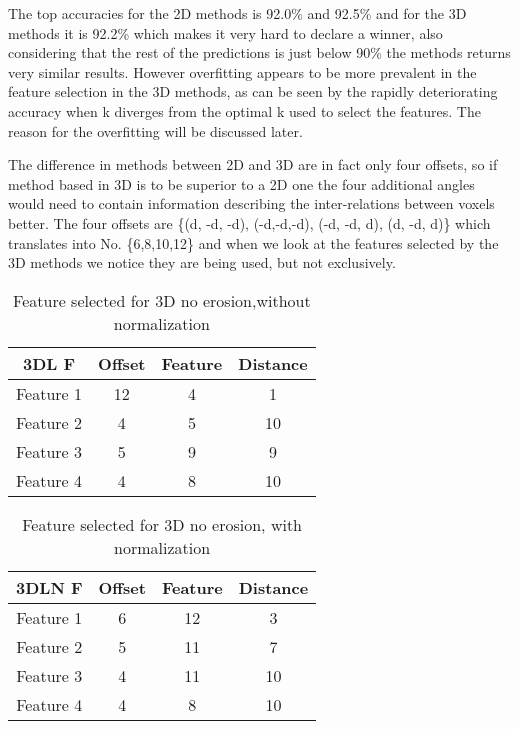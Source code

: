The top accuracies for the 2D methods is 92.0\% and 92.5\% and for the 3D methods it is 92.2\% which makes it very hard to declare a winner, also considering that the rest of the predictions is just below 90\% the methods returns very similar results. However overfitting appears to be more prevalent in the feature selection in the 3D methods, as can be seen by the rapidly deteriorating accuracy when k diverges from the optimal k used to select the features. The reason for the overfitting will be discussed later.

The difference in methods between 2D and 3D are in fact only four offsets, so if method based in 3D is to be superior to a 2D one the four additional angles would need to contain information describing the inter-relations between voxels better. The four offsets are \{(d, -d, -d), (-d,-d,-d), (-d, -d, d), (d, -d, d)\} which translates into No. \{6,8,10,12\} and when we look at the features selected by the 3D methods we notice they are being used, but not exclusively. 
\begin{table}[H]
  \centering
    \begin{tabular}{|c|c|c|c|}
    \hline
    3DL F & Offset & Feature & Distance \\ \hline
    Feature 1 & 12    & 4     & 1 \\ \hline
    Feature 2 & 4     & 5     & 10 \\ \hline
    Feature 3 & 5     & 9     & 9 \\ \hline
    Feature 4 & 4     & 8     & 10 \\ \hline
    \end{tabular}%
 \caption{Feature selected for 3D no erosion,without normalization}\label{tab:3DL F}%
\end{table}%
\begin{table}[H]
  \centering
    \begin{tabular}{|c|c|c|c|}
     \hline
    3DLN F & Offset & Feature & Distance \\ \hline
    Feature 1 & 6     & 12    & 3 \\ \hline
    Feature 2 & 5     & 11    & 7 \\ \hline
    Feature 3 & 4     & 11    & 10 \\ \hline
    Feature 4 & 4     & 8     & 10 \\ \hline
    \end{tabular}%
 \caption{Feature selected for 3D no erosion, with normalization}\label{tab:3DLN F}%
\end{table}%


